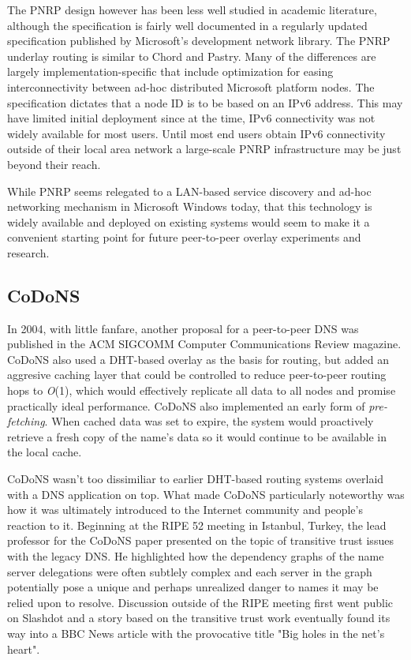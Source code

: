 \documentclass[sigconf]{acmart}
\begin{document}
The PNRP design however has been less well studied in academic
literature, although the specification is fairly well documented in a
regularly updated specification published by Microsoft's development
network library.\cite{microsoft_peer_2017}  The PNRP underlay routing is
similar to Chord and Pastry.  Many of the differences are largely
implementation-specific that include optimization for easing
interconnectivity between ad-hoc distributed Microsoft platform nodes.
The specification dictates that a node ID is to be based on an IPv6
address.  This may have limited initial deployment since at the time,
IPv6 connectivity was not widely available for most users.  Until most
end users obtain IPv6 connectivity outside of their local area network a
large-scale PNRP infrastructure may be just beyond their reach.

While PNRP seems relegated to a LAN-based service discovery and ad-hoc
networking mechanism in Microsoft Windows today, that this technology is
widely available and deployed on existing systems would seem to make it
a convenient starting point for future peer-to-peer overlay experiments
and research.

\subsection{CoDoNS}

In 2004, with little fanfare, another proposal for a peer-to-peer DNS
was published in the ACM SIGCOMM Computer Communications Review
magazine.\cite{ramasubramanian_design_2004}  CoDoNS also used a
DHT-based overlay as the basis for routing, but added an aggresive
caching layer that could be controlled to reduce peer-to-peer routing
hops to \emph{O}(1), which would effectively replicate all data to all
nodes and promise practically ideal performance.  CoDoNS also
implemented an early form of \emph{pre-fetching}.  When cached data
was set to expire, the system would proactively retrieve a fresh copy of
the name's data so it would continue to be available in the local cache.

CoDoNS wasn't too dissimiliar to earlier DHT-based routing systems
overlaid with a DNS application on top.  What made CoDoNS particularly
noteworthy was how it was ultimately introduced to the Internet
community and people's reaction to it.  Beginning at the RIPE 52 meeting
in Istanbul, Turkey, the lead professor for the CoDoNS paper
presented on the topic of transitive trust issues with the legacy DNS.
He highlighted how the dependency graphs of the name server delegations
were often subtlely complex and each server in the graph potentially
pose a unique and perhaps unrealized danger to names it may be relied
upon to resolve.  Discussion outside of the RIPE meeting first went
public on Slashdot and a story based on the transitive trust work
eventually found its way into a BBC News article with the provocative
title "Big holes in the net's
heart".\cite{cmdrtaco_perils_2006}\cite{ward_big_2006}
\end{document}
